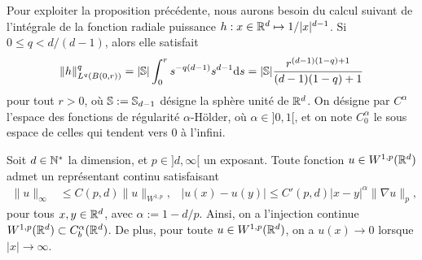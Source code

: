 Pour exploiter la proposition précédente, nous aurons besoin du calcul suivant de l'intégrale de la fonction radiale puissance $h : x \in \mathbb{R}^d \mapsto 1/|x|^{d-1}$. Si $0 \leq q < d/(d-1)$, alors elle satisfait
\begin{equation}
\label{eq:normLqPow}
	\|h\|^q_{L^q(B(0,r))} = |\bS| \int_0^r s^{-q(d-1)} s^{d-1} \diff s = |\bS| \frac{r^{(d-1)(1-q)+1}}{(d-1)(1-q)+1}
\leancheck{eq:normLqPow}%
\end{equation}
pour tout $r>0$, où $\mathbb{S} := \mathbb{S}_{d-1}$ désigne la sphère unité de $\mathbb{R}^d$.
On désigne par $C^\alpha$ l'espace des fonctions de régularité $\alpha$-Hölder, où $\alpha\in ]0,1[$, et on note $C^\alpha_0$ le sous espace de celles qui tendent vers $0$ à l'infini. 

\begin{theorem}
\label{th:injSurCrit}
%
Soit $d \in \mathbb{N}^*$ la dimension, et $p \in ]d,\infty[$ un exposant. Toute fonction $u\in W^{1,p}(\mathbb{R}^d)$ admet un représentant continu satisfaisant
\begin{align}
\label{eq:inj_sur_critique}
	\|u\|_\infty &\leq C(p,d) \|u\|_{W^{1,p}},&
	|u(x)-u(y)| \leq C'(p,d) |x-y|^\alpha \| \nabla u\|_p, 
\end{align}
 pour tous $x,y \in \mathbb{R}^d$, avec $\alpha := 1-d/p$. Ainsi, on a l'injection continue $W^{1,p}(\mathbb{R}^d) \subset C_b^\alpha(\mathbb{R}^d)$. De plus, pour toute $u \in W^{1,p}(\mathbb{R}^d)$, on a $u(x) \to 0$ lorsque $|x| \to \infty$.
\end{theorem}

